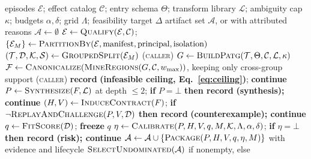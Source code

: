 \begin{algorithm}[t]
\caption{\textsc{Compile} --- the compile-or-retire cascade. Every candidate is either
registered or assigned an attributed \retire, so refusal accounting remains explicit.
Stages marked \textsc{(caller)} are separate library entry points run in this order
rather than steps inside one function.}
\label{alg:compile}
\footnotesize
\begin{algorithmic}[1]
\Require episodes $\mathcal{E}$; effect catalog $\mathcal{C}$; entry schema $\Theta$;
         transform library $\mathcal{L}$; ambiguity cap $\kappa$; budgets $\alpha,\delta$;
         grid $\Lambda$; feasibility target $\Delta$
\Ensure artifact set $\mathcal{A}$, or \retire{} with attributed reasons
\State $\mathcal{A}\gets\emptyset$
\State $\mathcal{E}\gets\textsc{Qualify}(\mathcal{E},\mathcal{C})$;\quad
       $\{\mathcal{E}_M\}\gets\textsc{PartitionBy}(\mathcal{E},\text{manifest},
       \text{principal},\text{isolation})$
  \State $(\mathcal{T},\mathcal{D},\mathcal{K},\mathcal{S})\gets
         \textsc{GroupedSplit}(\mathcal{E}_M)$ \hfill\textsc{(caller)}
  \State $G\gets\textsc{BuildPatg}(\mathcal{T},\Theta,\mathcal{C},\mathcal{L},\kappa)$ 
  \State $\mathcal{F}\gets\textsc{Canonicalize}(\textsc{MineRegions}
         (G,\mathcal{C},w_{\max}))$, keeping only cross-group support
   \hfill\textsc{(caller)}
     \State \textbf{record} \retire{} \textbf{(infeasible ceiling, Eq.~\ref{eq:ceiling})};
            \textbf{continue}
  \EndIf
    \State $P\gets\textsc{Synthesize}(F,\mathcal{L})$ at depth $\le 2$;\quad
           \textbf{if} $P=\bot$ \textbf{then record} \retire{} \textbf{(synthesis); continue}
    \State $(H,V)\gets\textsc{InduceContract}(F)$;\quad
           \textbf{if} $\neg\textsc{ReplayAndChallenge}(P,V,\mathcal{D})$
           \textbf{then record} \retire{} \textbf{(counterexample); continue}
    \State $q\gets\textsc{FitScore}(\mathcal{D})$; \textbf{freeze} $q$
    \State $\eta\gets\textsc{Calibrate}(P,H,V,q,M,\mathcal{K},\Lambda,\alpha,\delta)$;\quad
           \textbf{if} $\eta=\bot$ \textbf{then record} \retire{} \textbf{(risk); continue}
    \State $\mathcal{A}\gets\mathcal{A}\cup
           \{\textsc{Package}(P,H,V,q,\eta,M)\}$ with evidence and lifecycle
  \EndFor
\EndFor
\State \Return $\textsc{SelectUndominated}(\mathcal{A})$ if nonempty, else \retire{}
\end{algorithmic}
\end{algorithm}
